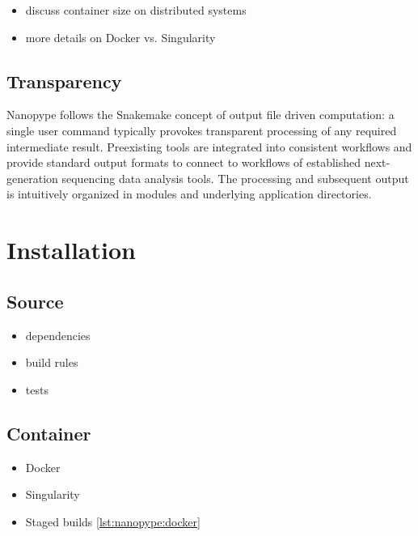 \begin{itemize}
	\item discuss container size on distributed systems
	\item more details on Docker vs. Singularity
\end{itemize}


\subsection{Transparency}
\label{subsec:nanopype:transparency}
Nanopype follows the Snakemake concept of output file driven computation: a single user command typically provokes transparent processing of any required intermediate result. Preexisting tools are integrated into consistent workflows and provide standard output formats to connect to workflows of established next-generation sequencing data analysis tools. The processing and subsequent output is intuitively organized in modules and underlying application directories.




\section{Installation}
\label{sec:nanopype:installation}

\subsection{Source}

\begin{itemize}
	\item dependencies
	\item build rules
	\item tests
\end{itemize}

\subsection{Container}





\begin{itemize}
	\item Docker
	\item Singularity
	\item Staged builds \ref{lst:nanopype:docker}
\end{itemize}

